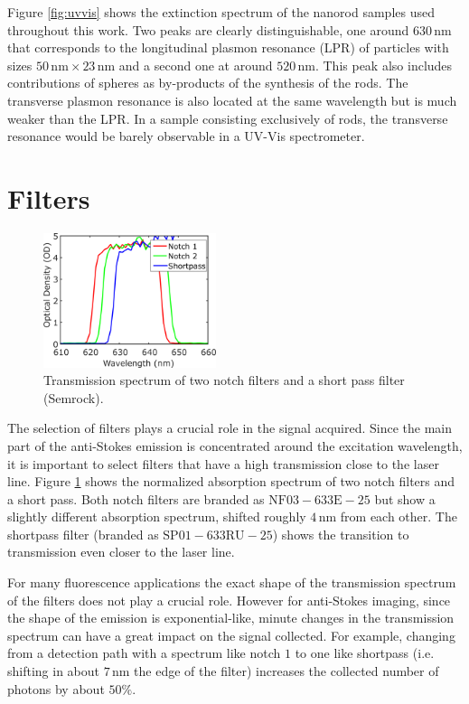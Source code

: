 \documentclass[journal=nalefd,manuscript=letter]{achemso}
\newcommand{\nm}{\ensuremath{\,\textrm{nm}}}
\begin{document}
 Figure \ref{fig:uvvis} shows the extinction spectrum of the nanorod samples
 used throughout this work. Two peaks are clearly distinguishable, one around
 $630\nm$ that corresponds to the longitudinal plasmon resonance (LPR) of
 particles with sizes $50\nm\times23\nm$ and a second one at around $520\nm$.
 This peak also includes contributions of spheres as by-products of the
 synthesis of the rods. The transverse plasmon resonance is also located at the
 same wavelength but is much weaker than the LPR. In a sample consisting exclusively of rods, the transverse resonance would be barely observable in a UV-Vis
 spectrometer.
 
 \section{Filters}

\begin{figure}[htp]
 \centering
 \includegraphics[width=0.45\textwidth]{Figures/Supplementary/03_Filters/filters.png}
 \caption{Transmission spectrum of two notch filters and a short pass
 filter (Semrock).}
 \label{fig:filters}
 \end{figure}
 
The selection of filters plays a crucial role in the signal acquired. Since the
main part of the anti-Stokes emission is concentrated around the excitation
wavelength, it is important to select filters that have a high transmission
close to the laser line. Figure \ref{fig:filters} shows the normalized
absorption spectrum of two notch filters and a short pass. Both notch filters are
branded as $\textrm{NF}03-633\textrm{E}-25$ but show a slightly different
absorption spectrum, shifted roughly $4\nm$ from each other. The shortpass
filter (branded as $\textrm{SP}01-633\textrm{RU}-25$) shows the transition to
transmission even closer to the laser line. 

For many fluorescence applications the exact shape of the transmission
spectrum of the filters does not play a crucial role. However for anti-Stokes
imaging, since the shape of the emission is exponential-like, minute
changes in the transmission spectrum can have a great impact on the signal collected. For example, changing from
a detection path with a spectrum like notch $1$ to one like shortpass (i.e.
shifting in about $7\nm$ the edge of the filter) increases the collected number
of photons by about $50\%$. 
\end{document}
